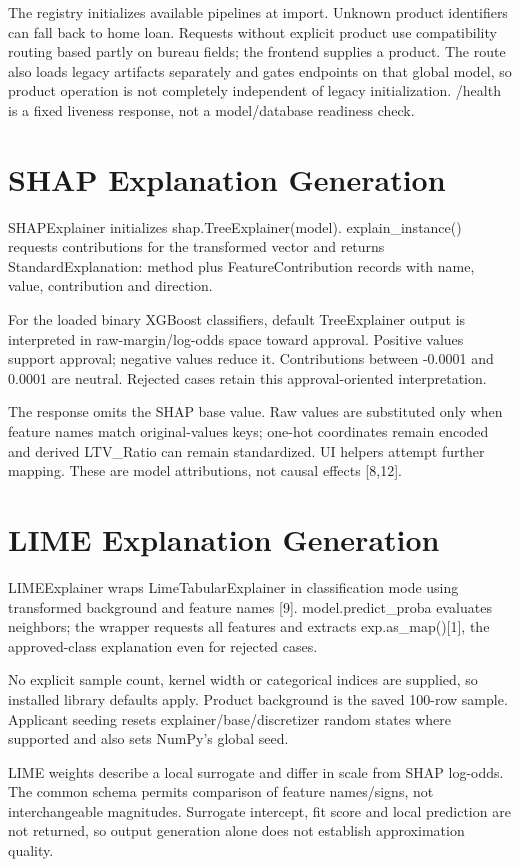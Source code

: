 \documentclass[12pt,a4paper]{report}
\begin{document}
The registry initializes available pipelines at import. Unknown product identifiers can fall back to home loan. Requests without explicit product use compatibility routing based partly on bureau fields; the frontend supplies a product. The route also loads legacy artifacts separately and gates endpoints on that global model, so product operation is not completely independent of legacy initialization. /health is a fixed liveness response, not a model/database readiness check.

\section{SHAP Explanation Generation}
SHAPExplainer initializes shap.TreeExplainer(model). explain\_instance() requests contributions for the transformed vector and returns StandardExplanation: method plus FeatureContribution records with name, value, contribution and direction.

For the loaded binary XGBoost classifiers, default TreeExplainer output is interpreted in raw-margin/log-odds space toward approval. Positive values support approval; negative values reduce it. Contributions between -0.0001 and 0.0001 are neutral. Rejected cases retain this approval-oriented interpretation.

The response omits the SHAP base value. Raw values are substituted only when feature names match original-values keys; one-hot coordinates remain encoded and derived LTV\_Ratio can remain standardized. UI helpers attempt further mapping. These are model attributions, not causal effects [8,12].

\section{LIME Explanation Generation}
LIMEExplainer wraps LimeTabularExplainer in classification mode using transformed background and feature names [9]. model.predict\_proba evaluates neighbors; the wrapper requests all features and extracts exp.as\_map()[1], the approved-class explanation even for rejected cases.

No explicit sample count, kernel width or categorical indices are supplied, so installed library defaults apply. Product background is the saved 100-row sample. Applicant seeding resets explainer/base/discretizer random states where supported and also sets NumPy's global seed.

LIME weights describe a local surrogate and differ in scale from SHAP log-odds. The common schema permits comparison of feature names/signs, not interchangeable magnitudes. Surrogate intercept, fit score and local prediction are not returned, so output generation alone does not establish approximation quality.
\end{document}
